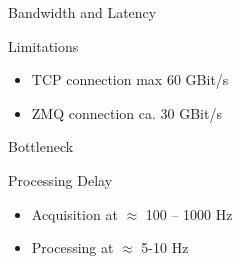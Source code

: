 \documentclass[aspectratio=169]{beamer}
\begin{document}
\begin{frame}{Bandwidth and Latency}
 \begin{block}{Limitations}
  \begin{itemize}
   \item TCP connection max 60 GBit/s
   \item ZMQ connection ca. 30 GBit/s
  \end{itemize}
 \end{block}
 
 \begin{block}{Bottleneck}
  \centering
 \end{block}
 
 \begin{block}{Processing Delay}
  \begin{itemize}
   \item Acquisition at $\approx$ 100 -- 1000 Hz
   \item Processing at $\approx$ 5-10 Hz
  \end{itemize}

 \end{block}
\end{frame}
\end{document}
